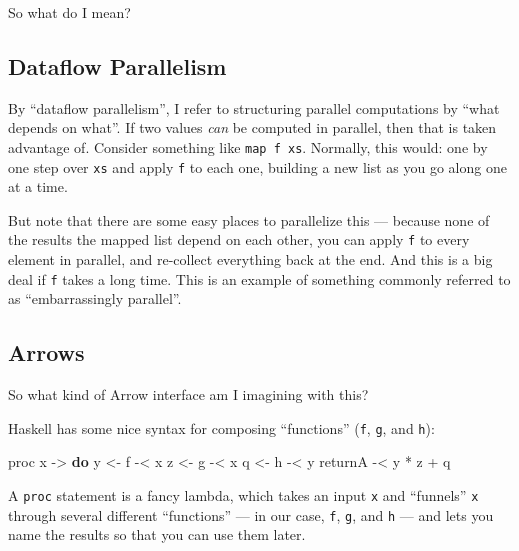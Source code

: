\documentclass[]{article}
\newenvironment{Shaded}{}{}
\newcommand{\KeywordTok}[1]{\textcolor[rgb]{0.00,0.44,0.13}{\textbf{#1}}}
\newcommand{\NormalTok}[1]{#1}
\newcommand{\OperatorTok}[1]{\textcolor[rgb]{0.40,0.40,0.40}{#1}}
\newcommand{\OtherTok}[1]{\textcolor[rgb]{0.00,0.44,0.13}{#1}}
\begin{document}
So what do I mean?

\subsection{Dataflow Parallelism}\label{dataflow-parallelism}

By ``dataflow parallelism'', I refer to structuring parallel computations by
``what depends on what''. If two values \emph{can} be computed in parallel, then
that is taken advantage of. Consider something like \texttt{map\ f\ xs}.
Normally, this would: one by one step over \texttt{xs} and apply \texttt{f} to
each one, building a new list as you go along one at a time.

But note that there are some easy places to parallelize this --- because none of
the results the mapped list depend on each other, you can apply \texttt{f} to
every element in parallel, and re-collect everything back at the end. And this
is a big deal if \texttt{f} takes a long time. This is an example of something
commonly referred to as ``embarrassingly parallel''.

\subsection{Arrows}\label{arrows}

So what kind of Arrow interface am I imagining with this?

Haskell has some nice syntax for composing ``functions'' (\texttt{f},
\texttt{g}, and \texttt{h}):

\begin{Shaded}
\begin{Highlighting}[]
\NormalTok{proc x }\OtherTok{{-}\textgreater{}} \KeywordTok{do}
\NormalTok{    y }\OtherTok{\textless{}{-}}\NormalTok{ f }\OperatorTok{{-}\textless{}}\NormalTok{ x}
\NormalTok{    z }\OtherTok{\textless{}{-}}\NormalTok{ g }\OperatorTok{{-}\textless{}}\NormalTok{ x}
\NormalTok{    q }\OtherTok{\textless{}{-}}\NormalTok{ h }\OperatorTok{{-}\textless{}}\NormalTok{ y}
\NormalTok{    returnA }\OperatorTok{{-}\textless{}}\NormalTok{ y }\OperatorTok{*}\NormalTok{ z }\OperatorTok{+}\NormalTok{ q}
\end{Highlighting}
\end{Shaded}

A \texttt{proc} statement is a fancy lambda, which takes an input \texttt{x} and
``funnels'' \texttt{x} through several different ``functions'' --- in our case,
\texttt{f}, \texttt{g}, and \texttt{h} --- and lets you name the results so that
you can use them later.
\end{document}
